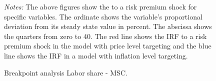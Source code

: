 \documentclass[11pt, a4paper, leqno]{article}
\begin{document}
\begin{figure}[ht!]
	\caption{Breakpoint analysis Labor share - MSC.}
	\centering
    	\bigskip
	\begin{minipage}{\textwidth}%
		\footnotesize\setlength{\baselineskip}{11pt}%
		\bigskip \textit{Notes:} The above figures show the  to a risk premium shock for specific variables. The ordinate shows the variable's proportional deviation from its steady state value in percent. The abscissa shows the quarters from zero to 40. The red line shows the IRF to a risk premium shock in the model with price level targeting and the blue line shows the IRF in a model with inflation level targeting.
	\end{minipage}
\end{figure}
\end{document}
